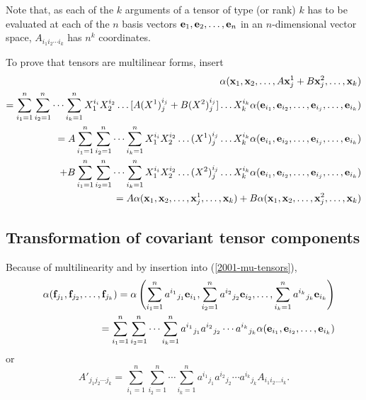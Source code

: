 Note that, as each of the $k$ arguments of  a tensor of type (or rank) $k$ has to be evaluated
at each of the $n$ basis vectors ${\bf e}_1,{\bf e}_2,\ldots ,{\bf e}_n$ in an $n$-dimensional vector space,
$A_{{i_1}{i_2}\cdots {i_k}} $ has $n^k$  coordinates.

{\color{OliveGreen}
\bproof
To prove that tensors are multilinear forms, insert
\begin{equation}
\begin{split}
 \alpha ( {\bf x}_1,{\bf x}_2,\ldots , A{\bf x}^1_j+B{\bf x}_j^2,\ldots ,{\bf x}_k)
\\
=
\sum_{i_1=1}^n
\sum_{i_2=1}^n
\cdots
\sum_{i_k=1}^n
X^{i_i}_1X^{i_2}_2\ldots  [A(X^1)^{i_j}_j+B(X^2)^{i_j}_j]\ldots X^{i_k}_k
\alpha ( {\bf e}_{i_1},{\bf e}_{i_2},\ldots,{\bf e}_{i_j},\ldots ,{\bf e}_{i_k})
\\
= A
\sum_{i_1=1}^n
\sum_{i_2=1}^n
\cdots
\sum_{i_k=1}^n
X^{i_i}_1X^{i_2}_2\ldots  (X^1)^{i_j}_j\ldots X^{i_k}_k
\alpha ( {\bf e}_{i_1},{\bf e}_{i_2},\ldots,{\bf e}_{i_j},\ldots ,{\bf e}_{i_k})
\\
\quad +
B
\sum_{i_1=1}^n
\sum_{i_2=1}^n
\cdots
\sum_{i_k=1}^n
X^{i_i}_1X^{i_2}_2\ldots  (X^2)^{i_j}_j\ldots X^{i_k}_k
\alpha ( {\bf e}_{i_1},{\bf e}_{i_2},\ldots,{\bf e}_{i_j},\ldots ,{\bf e}_{i_k})
\\
=
A \alpha ( {\bf x}_1,{\bf x}_2,\ldots , {\bf x}^1_j,\ldots ,{\bf x}_k)+
B \alpha ( {\bf x}_1,{\bf x}_2,\ldots , {\bf x}_j^2,\ldots ,{\bf x}_k)\nonumber
\end{split}
\end{equation}
\eproof
}

\subsection{Transformation of covariant tensor components}

Because of multilinearity  and by insertion into
(\ref{2001-mu-tensors}),
\begin{eqnarray}
&&\alpha ( {\bf f}_{j_1},{\bf f}_{j_2},\ldots ,{\bf f}_{j_k})=
\alpha \left(
\sum_{i_1=1}^n {a^{i_1}}_{j_1} {\bf e}_{i_1},
\sum_{i_2=1}^n {a^{i_2}}_{j_2} {\bf e}_{i_2},
\ldots ,
\sum_{i_k=1}^n {a^{i_k}}_{j_k} {\bf e}_{i_k}
\right)
\nonumber \\&& \quad
=
\sum_{i_1=1}^n\sum_{i_2=1}^n\cdots \sum_{i_k=1}^n
{a^{i_1}}_{j_1}{a^{i_2}}_{j_2}\cdots {a^{i_k}}_{j_k} \alpha ( {\bf e}_{i_1},{\bf e}_{i_2},\ldots ,{\bf e}_{i_k})
\label{2012-m-ch-tensor-etotc1}
\end{eqnarray}
or
\begin{equation}
A'_{{j_1}{j_2}\cdots {j_k}}=
\sum_{i_1=1}^n\sum_{i_2=1}^n\cdots \sum_{i_k=1}^n
{a^{i_1}}_{j_1}{a^{i_2}}_{j_2}\cdots {a^{i_k}}_{j_k} A_{i_1 i_2\ldots i_k}.
\label{2011-m-tvtcov}
\end{equation}

